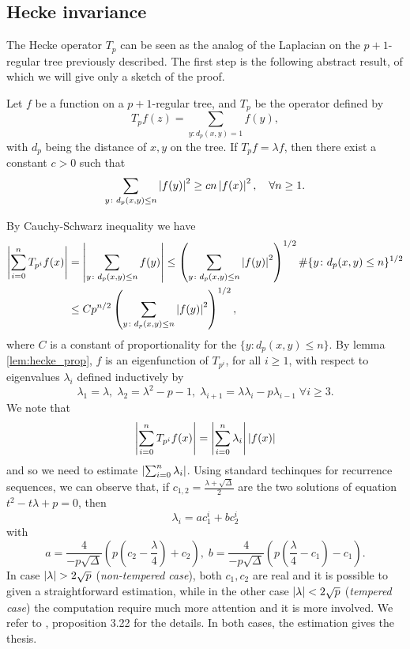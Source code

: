 \subsection{Hecke invariance}


The Hecke operator $T_{p}$ can be seen as the analog of the Laplacian on the $p+1$-regular tree previously described. The first step is the following abstract result, of which we will give only a sketch of the proof.

\begin{nprop}
\label{prop:eign_on_tree}
Let $f$ be a function on a $p+1$-regular tree, and $T_{p}$ be the operator defined by
\[
T_{p}f(z)=\sum_{y\colon d_{p}(x,y)=1}f(y),
\]
with $d_{p}$ being the distance of $x,y$ on the tree. If $T_{p}f=\lambda f$, then there exist a constant $c>0$ such that
\[
\sum_{y\colon d_{p}(x,y)\leq n}\left| f(y)\right|^{2}\geq c n\left| f(x)\right|^{2},\quad\forall n\geq1.
\]
\end{nprop}
\begin{prf}
By Cauchy-Schwarz inequality we have 
\begin{align*}
\left| \sum_{i=0}^{n}T_{p^{i}}f(x)\right|&=\left| \sum_{y\colon d_{p}(x,y)\leq n}f(y)\right|\leq\left(\sum_{y\colon d_{p}(x,y)\leq n}\left| f(y)\right|^{2}\right)^{1/2}
\#\{y\colon d_{p}(x,y)\leq n\}^{1/2}
\\
&\leq C p^{n/2}\left(\sum_{y\colon d_{p}(x,y)\leq n}\left| f(y)\right|^{2}\right)^{1/2},
\end{align*}
where $C$ is a constant of proportionality for the  $\{y\colon d_{p}(x,y)\leq n\}$. By lemma \ref{lem:hecke_prop}, $f$ is an eigenfunction of $T_{p^{i}}$, for all $i\geq1$, with respect to eigenvalues $\lambda_{i}$ defined inductively by
\[
\lambda_{1}=\lambda,\;\lambda_{2}=\lambda^{2}-p-1,\;\lambda_{i+1}=\lambda\lambda_{i}-p\lambda_{i-1}\;\forall i\geq3.
\]
We note that 
\[
\left| \sum_{i=0}^{n}T_{p^{i}}f(x)\right|=\left| \sum_{i=0}^{n}\lambda_{i}\right|\left| f(x)\right|
\]
and so we need to estimate $\left| \sum_{i=0}^{n}\lambda_{i}\right|$. Using standard techinques for recurrence sequences, we can observe that, if $c_{1,2}=\frac{\lambda+\sqrt{\Delta}}{2}$ are the two solutions of equation $t^{2}-t\lambda+p=0$, then 
\[
\lambda_{i}=a c_{1}^{i}+bc_{2}^{i}
\] 
with 
\[
a=\frac{4}{-p\sqrt{\Delta}}\left(p\left(c_{2}-\frac{\lambda}{4}\right)+c_{2}\right),\;b=\frac{4}{-p\sqrt{\Delta}}\left(p\left(\frac{\lambda}{4}-c_{1}\right)-c_{1}\right).
\]
In case $\abs{\lambda}>2\sqrt{p}$ (\emph{non-tempered case}), both $c_{1},c_{2}$ are real and it is possible to given a straightforward estimation, while in the other case $\left| \lambda\right|<2\sqrt{p}$ (\emph{tempered case}) the computation require much more attention and it is more involved. We refer to \cite{EinTW:AQUE}, proposition 3.22 for the details. In both cases, the estimation gives the thesis.
\end{prf}


